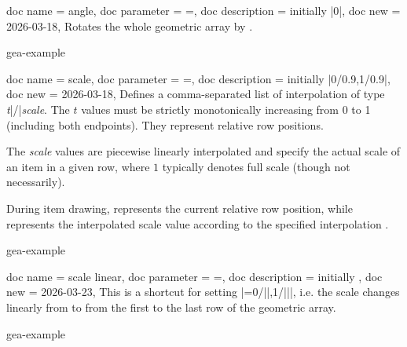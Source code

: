 \documentclass[a4paper,11pt]{article}
\begin{document}
\begin{docGeaKeys}
  {
    {
      doc name        = angle,
      doc parameter   = {=},
      doc description = {initially |0|},
      doc new         = 2026-03-18,
    }
  }
  Rotates the whole geometric array by .

\begin{dispExample*}{gea-example}
\end{dispExample*}
\end{docGeaKeys}


\clearpage
\begin{docGeaKeys}
  {
    {
      doc name        = scale,
      doc parameter   = {=},
      doc description = {initially |0/0.9,1/0.9|},
      doc new         = 2026-03-18,
    }
  }
Defines a comma-separated list of interpolation  of type
\emph{t}|/|\emph{scale}. The $t$ values must be strictly monotonically
increasing from 0 to 1 (including both endpoints). They represent relative row
positions.\par
The \emph{scale} values are piecewise linearly interpolated and specify the actual scale
of an item in a given row, where $1$ typically denotes full scale (though not
necessarily).\par
During item drawing,  represents the
current relative row position, while 
represents the interpolated scale value according to the specified interpolation
.

\begin{dispExample*}{gea-example}
\end{dispExample*}
\end{docGeaKeys}


\begin{docGeaKeys}
  {
    {
      doc name        = scale linear,
      doc parameter   = {=},
      doc description = {initially \texttt{\textbraceright{}\textbraceright}},
      doc new         = 2026-03-23,
    }
  }
  This is a shortcut for setting
  |={0/||,1/||}|,
  i.e. the scale changes linearly from  to 
  from the first to the last row of the geometric array.
\begin{dispExample*}{gea-example}
\end{dispExample*}
\end{docGeaKeys}
\end{document}
